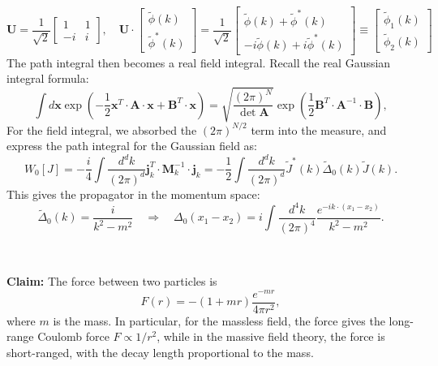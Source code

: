 \documentclass[aps,prb,superscriptaddress,nofootinbib]{revtex4}
\begin{document}
\begin{equation*}
	\mathbf U = \frac{1}{\sqrt 2} \left[\begin{array}{cc}
		1 & 1 \\
		-i & i
	\end{array}\right], \quad
	\mathbf U \cdot \left[
	\begin{array}{c}
		\tilde{\phi}(k) \\ 
		\tilde{\phi}^*(k) 
	\end{array}\right] 
	= \frac{1}{\sqrt 2}\left[
	\begin{array}{c}
		\tilde\phi(k)+\tilde\phi^*(k) \\ 
		-i\tilde\phi(k)+i\tilde\phi^*(k)
	\end{array}\right]
	\equiv \left[
	\begin{array}{c}
		\tilde\phi_1(k) \\ 
		\tilde\phi_2(k) 
	\end{array}\right]
\end{equation*}
The path integral then becomes a real field integral.
Recall the real Gaussian integral formula:
\begin{equation}
	\int d\mathbf x \exp\left(-\frac{1}{2}\mathbf{x}^T \cdot \mathbf A \cdot \mathbf{x} + \mathbf{B}^T \cdot \mathbf{x}\right) 
	= \sqrt{\frac{(2\pi)^N}{\det{\mathbf A}}}\exp\left(\frac{1}{2}\mathbf{B}^T \cdot \mathbf{A}^{-1} \cdot \mathbf{B}\right),
	\label{eq:real-gaussian-integral}
\end{equation}
For the field integral, we absorbed the $(2\pi)^{N/2}$ term into the measure, and express the path integral for the Gaussian field as:
\begin{equation}
	W_0[J] 
	= -\frac{i}{4}\int \frac{d^d k}{(2\pi)^d} \mathbf j^T_k \cdot \mathbf M^{-1}_k \cdot \mathbf j_k
	= -\frac{1}{2} \int \frac{d^d k}{(2\pi)^d}  \tilde{J}^*(k) \tilde{\Delta}_0(k) \tilde{J}(k).
\end{equation}
This gives the propagator in the momentum space:
\begin{equation}
	\tilde{\Delta}_0(k) = \frac{i}{k^2-m^2}
	\quad \Longrightarrow \quad 
	\Delta_0(x_1-x_2) = i\int\frac{d^{4} k}{(2\pi)^{4}} \frac{e^{-i k\cdot (x_1-x_2)}}{k^2-m^2}.
\end{equation}

\

\noindent\textbf{Claim:}
The force between two particles is
\begin{equation}\label{eq:free-field-force}
	F(r) = -(1+mr)\frac{e^{-mr}}{4\pi r^2},
\end{equation}
where $m$ is the mass.
In particular, for the massless field, the force gives the long-range Coulomb force $F \propto 1/r^2$, while in the massive field theory, the force is short-ranged, with the decay length proportional to the mass.
\end{document}
